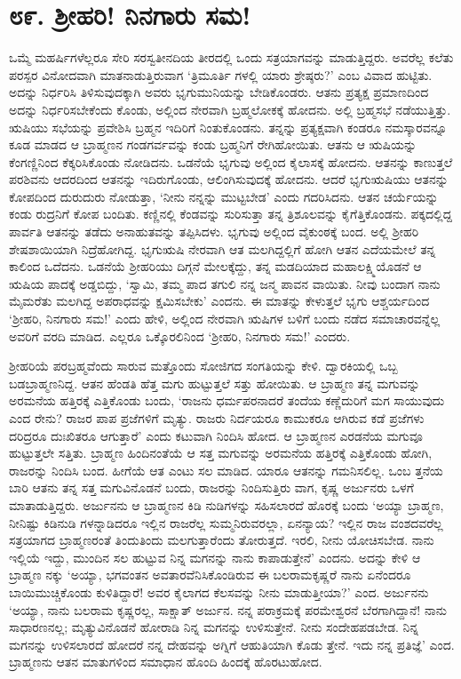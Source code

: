 
\chapter{೮೯. ಶ್ರೀಹರಿ! ನಿನಗಾರು ಸಮ!}

ಒಮ್ಮೆ ಮಹರ್ಷಿಗಳೆಲ್ಲರೂ ಸೇರಿ ಸರಸ್ವತೀನದಿಯ ತೀರದಲ್ಲಿ ಒಂದು ಸತ್ರಯಾಗವನ್ನು ಮಾಡುತ್ತಿದ್ದರು. ಅವರೆಲ್ಲ ಕಲೆತು ಪರಸ್ಪರ ವಿನೋದವಾಗಿ ಮಾತನಾಡುತ್ತಿರುವಾಗ ‘ತ್ರಿಮೂರ್ತಿ ಗಳಲ್ಲಿ ಯಾರು ಶ್ರೇಷ್ಠರು?’ ಎಂಬ ವಿವಾದ ಹುಟ್ಟಿತು. ಅದನ್ನು ನಿರ್ಧರಿಸಿ ತಿಳಿಸುವುದಕ್ಕಾಗಿ ಅವರು ಭೃಗುಮುನಿಯನ್ನು ಬೇಡಿಕೊಂಡರು. ಆತನು ಪ್ರತ್ಯಕ್ಷ ಪ್ರಮಾಣದಿಂದ ಅದನ್ನು ನಿರ್ಧರಿಸಬೇಕೆಂದು ಕೊಂಡು, ಅಲ್ಲಿಂದ ನೇರವಾಗಿ ಬ್ರಹ್ಮಲೋಕಕ್ಕೆ ಹೋದನು. ಅಲ್ಲಿ ಬ್ರಹ್ಮಸಭೆ ನಡೆಯುತ್ತಿತ್ತು. ಋಷಿಯು ಸಭೆಯನ್ನು ಪ್ರವೇಶಿಸಿ ಬ್ರಹ್ಮನ ಇದಿರಿಗೆ ನಿಂತುಕೊಂಡನು. ತನ್ನನ್ನು ಪ್ರತ್ಯಕ್ಷವಾಗಿ ಕಂಡರೂ ನಮಸ್ಕಾರವನ್ನೂ ಕೂಡ ಮಾಡದ ಆ ಬ್ರಾಹ್ಮಣನ ಗಂಡಗರ್ವವನ್ನು ಕಂಡು ಬ್ರಹ್ಮನಿಗೆ ರೇಗಿಹೋಯಿತು. ಆತನು ಆ ಋಷಿಯನ್ನು ಕೆಂಗಣ್ಣಿನಿಂದ ಕೆಕ್ಕರಿಸಿಕೊಂಡು ನೋಡಿದನು. ಒಡನೆಯೆ ಭೃಗುವು ಅಲ್ಲಿಂದ ಕೈಲಾಸಕ್ಕೆ ಹೋದನು. ಆತನನ್ನು ಕಾಣುತ್ತಲೆ ಪರಶಿವನು ಆದರದಿಂದ ಆತನನ್ನು ಇದಿರುಗೊಂಡು, ಆಲಿಂಗಿಸುವುದಕ್ಕೆ ಹೋದನು. ಆದರೆ ಭೃಗುಋಷಿಯು ಆತನನ್ನು ಕೋಪದಿಂದ ದುರುದುರು ನೋಡುತ್ತಾ, ‘ನೀನು ನನ್ನನ್ನು ಮುಟ್ಟಬೇಡ’ ಎಂದು ಗದರಿಸಿದನು. ಆತನ ಚರ್ಯೆಯನ್ನು ಕಂಡು ರುದ್ರನಿಗೆ ಕೋಪ ಬಂದಿತು. ಕಣ್ಣಿನಲ್ಲಿ ಕೆಂಡವನ್ನು ಸುರಿಸುತ್ತಾ ತನ್ನ ತ್ರಿಶೂಲವನ್ನು ಕೈಗೆತ್ತಿಕೊಂಡನು. ಪಕ್ಕದಲ್ಲಿದ್ದ ಪಾರ್ವತಿ ಆತನನ್ನು ತಡೆದು ಅನಾಹುತವನ್ನು ತಪ್ಪಿಸಿದಳು. ಭೃಗುವು ಅಲ್ಲಿಂದ ವೈಕುಂಠಕ್ಕೆ ಬಂದ. ಅಲ್ಲಿ ಶ್ರೀಹರಿ ಶೇಷಶಾಯಿಯಾಗಿ ನಿದ್ರೆಹೋಗಿದ್ದ. ಭೃಗುಋಷಿ ನೇರವಾಗಿ ಆತ ಮಲಗಿದ್ದಲ್ಲಿಗೆ ಹೋಗಿ ಆತನ ಎದೆಯಮೇಲೆ ತನ್ನ ಕಾಲಿಂದ ಒದೆದನು. ಒಡನೆಯೆ ಶ್ರೀಹರಿಯು ದಿಗ್ಗನೆ ಮೇಲಕ್ಕೆದ್ದು, ತನ್ನ ಮಡದಿಯಾದ ಮಹಾಲಕ್ಷ್ಮಿಯೊಡನೆ ಆ ಋಷಿಯ ಪಾದಕ್ಕೆ ಅಡ್ಡಬಿದ್ದು, ‘ಸ್ವಾಮಿ, ತಮ್ಮ ಪಾದ ತಗುಲಿ ನನ್ನ ಜನ್ಮ ಪಾವನ ವಾಯಿತು. ನೀವು ಬಂದಾಗ ನಾನು ಮೈಮರೆತು ಮಲಗಿದ್ದ ಅಪರಾಧವನ್ನು ಕ್ಷಮಿಸಬೇಕು’ ಎಂದನು. ಈ ಮಾತನ್ನು ಕೇಳುತ್ತಲೆ ಭೃಗು ಆಶ್ಚರ್ಯದಿಂದ ‘ಶ್ರೀಹರಿ, ನಿನಗಾರು ಸಮ!’ ಎಂದು ಹೇಳಿ, ಅಲ್ಲಿಂದ ನೇರವಾಗಿ ಋಷಿಗಳ ಬಳಿಗೆ ಬಂದು ನಡೆದ ಸಮಾಚಾರವನ್ನೆಲ್ಲ ಅವರಿಗೆ ವರದಿ ಮಾಡಿದ. ಎಲ್ಲರೂ ಒಕ್ಕೊರಲಿನಿಂದ ‘ಶ್ರೀಹರಿ, ನಿನಗಾರು ಸಮ!’ ಎಂದರು.

ಶ್ರೀಹರಿಯೆ ಪರಬ್ರಹ್ಮವೆಂದು ಸಾರುವ ಮತ್ತೊಂದು ಸೋಜಿಗದ ಸಂಗತಿಯನ್ನು ಕೇಳಿ. ದ್ವಾರಕಿಯಲ್ಲಿ ಒಬ್ಬ ಬಡಬ್ರಾಹ್ಮಣನಿದ್ದ. ಆತನ ಹೆಂಡತಿ ಹೆತ್ತ ಮಗು ಹುಟ್ಟುತ್ತಲೆ ಸತ್ತು ಹೋಯಿತು. ಆ ಬ್ರಾಹ್ಮಣ ತನ್ನ ಮಗುವನ್ನು ಅರಮನೆಯ ಹತ್ತಿರಕ್ಕೆ ಎತ್ತಿಕೊಂಡು ಬಂದು, ‘ರಾಜನು ಧರ್ಮಪರನಾದರೆ ತಂದೆಯ ಕಣ್ಣೆದುರಿಗೆ ಮಗ ಸಾಯುವುದು ಎಂದ ರೇನು? ರಾಜರ ಪಾಪ ಪ್ರಜೆಗಳಿಗೆ ಮೃತ್ಯು. ರಾಜರು ನಿರ್ದಯರೂ ಕಾಮುಕರೂ ಆಗಿರುವ ಕಡೆ ಪ್ರಜೆಗಳು ದರಿದ್ರರೂ ದುಃಖಿತರೂ ಆಗುತ್ತಾರೆ’ ಎಂದು ಕಟುವಾಗಿ ನಿಂದಿಸಿ ಹೋದ. ಆ ಬ್ರಾಹ್ಮಣನ ಎರಡನೆಯ ಮಗುವೂ ಹುಟ್ಟುತ್ತಲೇ ಸತ್ತಿತು. ಬ್ರಾಹ್ಮಣ ಹಿಂದಿನಂತೆಯೆ ಆ ಸತ್ತ ಮಗುವನ್ನು ಅರಮನೆಯ ಹತ್ತಿರಕ್ಕೆ ಎತ್ತಿಕೊಂಡು ಹೋಗಿ, ರಾಜರನ್ನು ನಿಂದಿಸಿ ಬಂದ. ಹೀಗೆಯೆ ಆತ ಎಂಟು ಸಲ ಮಾಡಿದ. ಯಾರೂ ಆತನನ್ನು ಗಮನಿಸಲಿಲ್ಲ. ಒಂಬ ತ್ತನೆಯ ಬಾರಿ ಆತನು ತನ್ನ ಸತ್ತ ಮಗುವಿನೊಡನೆ ಬಂದು, ರಾಜರನ್ನು ನಿಂದಿಸುತ್ತಿರು ವಾಗ, ಕೃಷ್ಣ ಅರ್ಜುನರು ಒಳಗೆ ಮಾತಾಡುತ್ತಿದ್ದರು. ಅರ್ಜುನನು ಆ ಬ್ರಾಹ್ಮಣನ ಕಿಡಿ ನುಡಿಗಳನ್ನು ಸಹಿಸಲಾರದೆ ಹೊರಕ್ಕೆ ಬಂದು ‘ಅಯ್ಯಾ ಬ್ರಾಹ್ಮಣ, ನೀನಿಷ್ಟು ಕಿಡಿನುಡಿ ಗಳನ್ನಾಡಿದರೂ ಇಲ್ಲಿನ ರಾಜರೆಲ್ಲ ಸುಮ್ಮನಿರುವರಲ್ಲಾ, ಏನನ್ಯಾಯ? ಇಲ್ಲಿನ ರಾಜ ವಂಶದವರೆಲ್ಲ ಸತ್ರಯಾಗದ ಬ್ರಾಹ್ಮಣರಂತೆ ತಿಂದುತಿಂದು ಮಲಗುತ್ತಾರೆಂದು ತೋರುತ್ತದೆ. ಇರಲಿ, ನೀನು ಯೋಚಿಸಬೇಡ. ನಾನು ಇಲ್ಲಿಯೆ ಇದ್ದು, ಮುಂದಿನ ಸಲ ಹುಟ್ಟುವ ನಿನ್ನ ಮಗನನ್ನು ನಾನು ಕಾಪಾಡುತ್ತೇನೆ’ ಎಂದನು. ಅದನ್ನು ಕೇಳಿ ಆ ಬ್ರಾಹ್ಮಣ ನಕ್ಕು ‘ಅಯ್ಯಾ, ಭಗವಂತನ ಅವತಾರವೆನಿಸಿಕೊಂಡಿರುವ ಈ ಬಲರಾಮಕೃಷ್ಣರೆ ನಾನು ಏನೆಂದರೂ ಬಾಯಿಮುಚ್ಚಿಕೊಂಡು ಕುಳಿತಿದ್ದಾರೆ! ಅವರ ಕೈಲಾಗದ ಕೆಲಸವನ್ನು ನೀನು ಮಾಡುತ್ತೀಯಾ?’ ಎಂದ. ಅರ್ಜುನನು ‘ಅಯ್ಯಾ, ನಾನು ಬಲರಾಮ ಕೃಷ್ಣರಲ್ಲ, ಸಾಕ್ಷಾತ್ ಅರ್ಜುನ. ನನ್ನ ಪರಾಕ್ರಮಕ್ಕೆ ಪರಮೇಶ್ವರನೆ ಬೆರಗಾಗಿದ್ದಾನೆ! ನಾನು ಸಾಧಾರಣನಲ್ಲ; ಮೃತ್ಯುವಿನೊಡನೆ ಹೋರಾಡಿ ನಿನ್ನ ಮಗನನ್ನು ಉಳಿಸುತ್ತೇನೆ. ನೀನು ಸಂದೇಹಪಡಬೇಡ. ನಿನ್ನ ಮಗನನ್ನು ಉಳಿಸಲಾರದೆ ಹೋದರೆ ನನ್ನ ದೇಹವನ್ನು ಅಗ್ನಿಗೆ ಆಹುತಿಯಾಗಿ ಕೊಡು ತ್ತೇನೆ. ಇದು ನನ್ನ ಪ್ರತಿಜ್ಞೆ’ ಎಂದ. ಬ್ರಾಹ್ಮಣನು ಆತನ ಮಾತುಗಳಿಂದ ಸಮಾಧಾನ ಹೊಂದಿ ಹಿಂದಕ್ಕೆ ಹೊರಟುಹೋದ.

